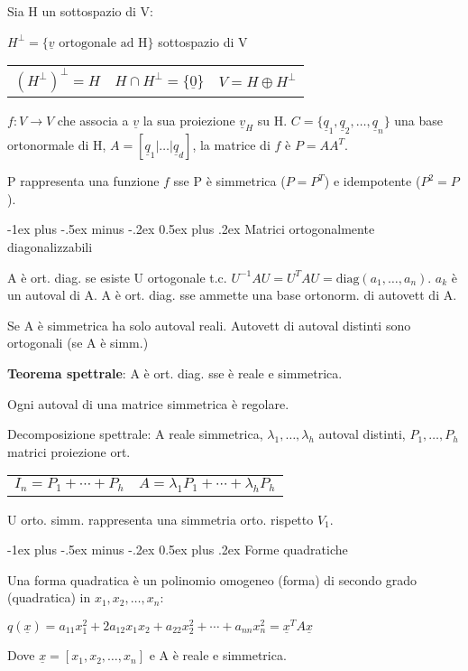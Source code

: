 \documentclass[10pt,landscape]{article}
\makeatletter
\renewcommand{\section}{\@startsection{section}{1}{0mm}%
                                {-1ex plus -.5ex minus -.2ex}%
                                {0.5ex plus .2ex}%
                                {\normalfont\large\bfseries}}
\renewcommand{\vec}[1]{\underline{#1}}
\newcommand{\diag}{\mathrm{diag}}
\makeatother
\begin{document}
\begin{multicols}{3}
Sia H un sottospazio di V:

$H^\perp = \{\vec{v}\text{ ortogonale ad H}\}$ sottospazio di V

\begin{tabular}{lll}
	$(H^\perp)^\perp = H$ & $H\cap H^\perp = \{\vec{0}\}$ & $V=H\oplus H^\perp$
\end{tabular}

$f: V \rightarrow V$ che associa a $\vec{v}$ la sua proiezione $\vec{v}_H$ su H.
$C = \{\vec{q}_1, \vec{q}_2, \dots, \vec{q}_n\}$ una base ortonormale di H, $A = [\vec{q}_1 | \dots | \vec{q}_d]$, la matrice di $f$ è $P=AA^T$.

P rappresenta una funzione $f$ sse P è simmetrica ($P=P^T$) e idempotente ($P^2=P$).

\section{Matrici ortogonalmente diagonalizzabili}

A è ort. diag. se esiste U ortogonale t.c. $U^{-1}AU = U^TAU = \diag(a_1, \dots, a_n)$. $a_k$ è un autoval di A.
A è ort. diag. sse ammette una base ortonorm. di autovett di A.

Se A è simmetrica ha solo autoval reali. Autovett di autoval distinti sono ortogonali (se A è simm.)

\textbf{Teorema spettrale}: A è ort. diag. sse è reale e simmetrica.

Ogni autoval di una matrice simmetrica è regolare.

Decomposizione spettrale: A reale simmetrica, $\lambda_1, \dots, \lambda_h$ autoval distinti, $P_1, \dots, P_h$ matrici proiezione ort.
\begin{tabular}{ll}
	$I_n = P_1 + \cdots + P_h$ & $A = \lambda_1P_1 + \cdots + \lambda_hP_h$
\end{tabular}

U orto. simm. rappresenta una simmetria orto. rispetto $V_1$.

\section{Forme quadratiche}

Una forma quadratica è un polinomio omogeneo (forma) di secondo grado (quadratica) in $x_1, x_2, \dots, x_n$:

$q(\vec{x}) = a_{11}x_1^2+2a_{12}x_1x_2+a_{22}x_2^2+\cdots+a_{nn}x_n^2 = \vec{x}^TA\vec{x}$

Dove $\vec{x} = [x_1, x_2, \dots, x_n]$ e A è reale e simmetrica.


\end{multicols}
\end{document}
